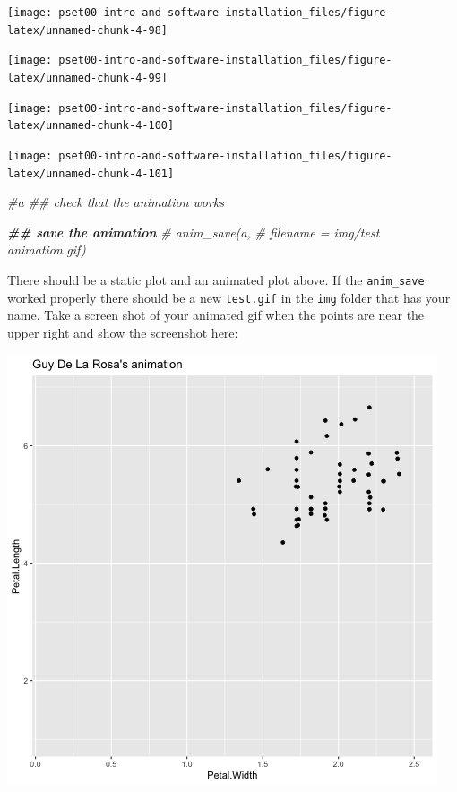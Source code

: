 \documentclass[
]{article}
\newenvironment{Shaded}{\begin{snugshade}}{\end{snugshade}}
\newcommand{\CommentTok}[1]{\textcolor[rgb]{0.56,0.35,0.01}{\textit{#1}}}
\newcommand{\DocumentationTok}[1]{\textcolor[rgb]{0.56,0.35,0.01}{\textbf{\textit{#1}}}}
\begin{document}
\begin{center}\texttt{[image: pset00-intro-and-software-installation\_files/figure-latex/unnamed-chunk-4-98]} \end{center}

\begin{center}\texttt{[image: pset00-intro-and-software-installation\_files/figure-latex/unnamed-chunk-4-99]} \end{center}

\begin{center}\texttt{[image: pset00-intro-and-software-installation\_files/figure-latex/unnamed-chunk-4-100]} \end{center}

\begin{center}\texttt{[image: pset00-intro-and-software-installation\_files/figure-latex/unnamed-chunk-4-101]} \end{center}

\begin{Shaded}
\begin{Highlighting}[]
\CommentTok{\#a  \#\# check that the animation works}

\DocumentationTok{\#\# save the animation}
\CommentTok{\# anim\_save(a, }
\CommentTok{\#           filename = \textquotesingle{}img/test animation.gif\textquotesingle{})}
\end{Highlighting}
\end{Shaded}

There should be a static plot and an animated plot above. If the
\texttt{anim\_save} worked properly there should be a new
\texttt{test.gif} in the \texttt{img} folder that has your name. Take a
screen shot of your animated gif when the points are near the upper
right and show the screenshot here:

\includegraphics{img/snip of test animation.png}
\end{document}
